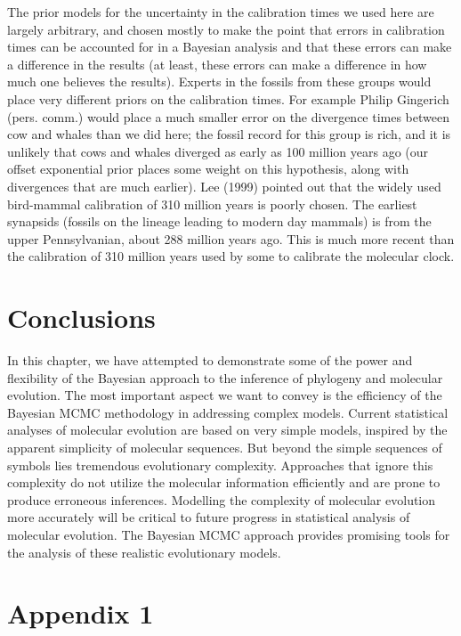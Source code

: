 \documentclass{svmult}
\begin{document}
The prior models for the uncertainty in the calibration times we used here are largely arbitrary,
and chosen mostly to make the point that errors in calibration times can be accounted for in a
Bayesian analysis and that these errors can make a difference in the results (at least, these
errors can make a difference in how much one believes the results). Experts in the fossils from
these groups would place very different priors on the calibration times. For example Philip
Gingerich (pers. comm.) would place a much smaller error on the divergence times between cow and
whales than we did here; the fossil record for this group is rich, and it is unlikely that cows and
whales diverged as early as 100 million years ago (our offset exponential prior places some weight
on this hypothesis, along with divergences that are much earlier).  Lee (1999) pointed out that the
widely used bird-mammal calibration of 310 million years is poorly chosen. The earliest synapsids
(fossils on the lineage leading to modern day mammals) is from the upper Pennsylvanian, about 288
million years ago. This is much more recent than the calibration of 310 million years used by some
to calibrate the molecular clock. 

\section{Conclusions}
\label{sec:4}

In this chapter, we have attempted to demonstrate some of the power and flexibility of the Bayesian
approach to the inference of phylogeny and molecular evolution. The most important aspect we want
to convey is the efficiency of the Bayesian MCMC methodology in addressing complex models.  Current
statistical analyses of molecular evolution are based on very simple models, inspired by the
apparent simplicity of molecular sequences. But beyond the simple sequences of symbols lies
tremendous evolutionary complexity. Approaches that ignore this complexity do not utilize the
molecular information efficiently and are prone to produce erroneous inferences. Modelling the
complexity of molecular evolution more accurately will be critical to future progress in
statistical analysis of molecular evolution. The Bayesian MCMC approach provides promising tools
for the analysis of these realistic evolutionary models.


\newpage


\section*{Appendix 1}
\end{document}
